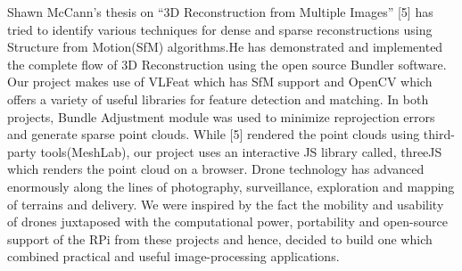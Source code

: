 Shawn McCann's thesis on “3D Reconstruction from Multiple Images” [5] has tried to identify various techniques for dense and sparse reconstructions using Structure from Motion(SfM) algorithms.He has demonstrated and implemented the complete flow of 3D Reconstruction using the open source Bundler software. Our project makes use of VLFeat which has SfM support and OpenCV which offers a variety of useful libraries for feature detection and matching. In both projects, Bundle Adjustment module was used to minimize reprojection errors and generate sparse point clouds. While [5] rendered the point clouds using third-party tools(MeshLab), our project uses an interactive JS library called, threeJS which renders the point cloud on a browser.\newline
Drone technology has advanced enormously along the lines of photography, surveillance, exploration and mapping of terrains and delivery. We were inspired by the fact the mobility and usability of drones juxtaposed with the computational power, portability and open-source support of the RPi from these projects and hence, decided to build one which combined practical and useful image-processing applications.
